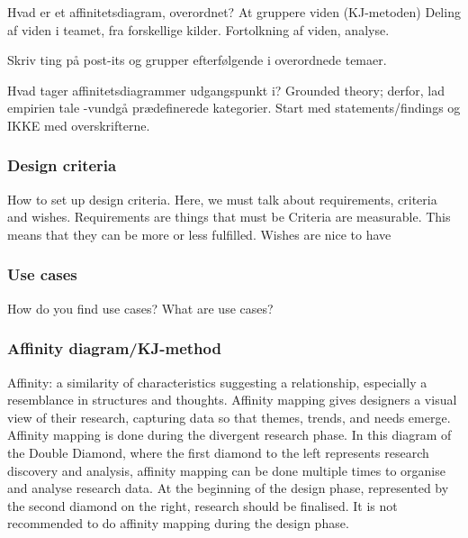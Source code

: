 Hvad er et affinitetsdiagram, overordnet?
At gruppere viden (KJ-metoden)
Deling af viden i teamet, fra forskellige kilder.
Fortolkning af viden, analyse.

Skriv ting på post-its og grupper efterfølgende i overordnede temaer.

Hvad tager affinitetsdiagrammer udgangspunkt i?
Grounded theory; derfor, lad empirien tale -vundgå prædefinerede kategorier.
Start med statements/findings og IKKE med overskrifterne.

\subsubsection{Design criteria}
How to set up design criteria.
Here, we must talk about requirements, criteria and wishes.
Requirements are things that must be
Criteria are measurable. This means that they can be more or less fulfilled.
Wishes are nice to have

\subsubsection{Use cases}
How do you find use cases? What are use cases?

\subsubsection{Affinity diagram/KJ-method}
Affinity: a similarity of characteristics suggesting a relationship, especially a resemblance in structures and thoughts.
Affinity mapping gives designers a visual view of their research, capturing data so that themes, trends, and needs emerge.
Affinity mapping is done during the divergent research phase. In this diagram of the Double Diamond, where the first diamond to the left represents research discovery and analysis, affinity mapping can be done multiple times to organise and analyse research data. At the beginning of the design phase, represented by the second diamond on the right, research should be finalised. It is not recommended to do affinity mapping during the design phase.